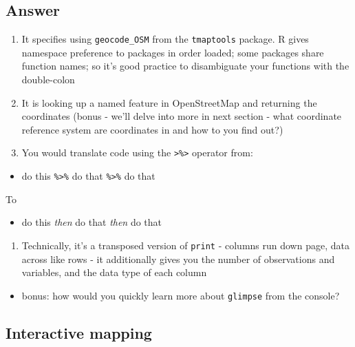 \documentclass[
]{book}
\providecommand{\tightlist}{%
  \setlength{\itemsep}{0pt}\setlength{\parskip}{0pt}}
\begin{document}
\hypertarget{answer-2}{%
\subsection{Answer}\label{answer-2}}

\begin{enumerate}
\def\labelenumi{\arabic{enumi}.}
\tightlist
\item
  It specifies using \texttt{geocode\_OSM} from the \texttt{tmaptools} package. R gives namespace preference to packages in order loaded; some packages share function names; so it's good practice to disambiguate your functions with the double-colon
\item
  It is looking up a named feature in OpenStreetMap and returning the coordinates (bonus - we'll delve into more in next section - what coordinate reference system are coordinates in and how to you find out?)
\item
  You would translate code using the \texttt{\textgreater{}\%\textgreater{}} operator from:
\end{enumerate}

\begin{itemize}
\tightlist
\item
  do this \texttt{\%\textgreater{}\%} do that \texttt{\%\textgreater{}\%} do that
\end{itemize}

To

\begin{itemize}
\tightlist
\item
  do this \emph{then} do that \emph{then} do that
\end{itemize}

\begin{enumerate}
\def\labelenumi{\arabic{enumi}.}
\setcounter{enumi}{3}
\tightlist
\item
  Technically, it's a transposed version of \texttt{print} - columns run down page, data across like rows - it additionally gives you the number of observations and variables, and the data type of each column
\end{enumerate}

\begin{itemize}
\tightlist
\item
  bonus: how would you quickly learn more about \texttt{glimpse} from the console?
\end{itemize}

\hypertarget{interactive-mapping}{%
\subsection{Interactive mapping}\label{interactive-mapping}}
\end{document}
